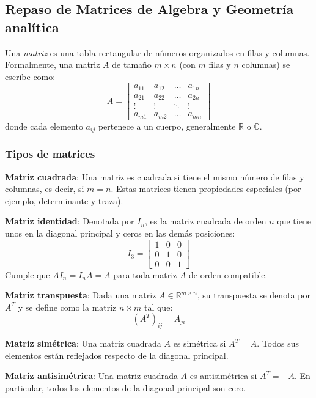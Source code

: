 \subsection{Repaso de Matrices de Algebra y Geometría analítica}
\label{sec:repaso_matrices}

Una \textit{matriz} es una tabla rectangular de números organizados en filas y columnas. Formalmente, una matriz \(A\) de tamaño \(m \times n\) (con \(m\) filas y \(n\) columnas) se escribe como:
\[
A = \begin{bmatrix}
a_{11} & a_{12} & \dots & a_{1n} \\
a_{21} & a_{22} & \dots & a_{2n} \\
\vdots & \vdots & \ddots & \vdots \\
a_{m1} & a_{m2} & \dots & a_{mn}
\end{bmatrix}
\]
donde cada elemento \(a_{ij}\) pertenece a un cuerpo, generalmente \(\mathbb{R}\) o \(\mathbb{C}\).

\subsubsection{Tipos de matrices}

\textbf{Matriz cuadrada}: Una matriz es cuadrada si tiene el mismo número de filas y columnas, es decir, si \(m = n\). Estas matrices tienen propiedades especiales (por ejemplo, determinante y traza).

\textbf{Matriz identidad}: Denotada por \(I_n\), es la matriz cuadrada de orden \(n\) que tiene unos en la diagonal principal y ceros en las demás posiciones:
\[
I_3 = \begin{bmatrix}
1 & 0 & 0 \\
0 & 1 & 0 \\
0 & 0 & 1
\end{bmatrix}
\]
Cumple que \(AI_n = I_nA = A\) para toda matriz \(A\) de orden compatible.

\textbf{Matriz transpuesta}: Dada una matriz \(A \in \mathbb{R}^{m \times n}\), su transpuesta se denota por \(A^T\) y se define como la matriz \(n \times m\) tal que:
\[
(A^T)_{ij} = A_{ji}
\]

\textbf{Matriz simétrica}: Una matriz cuadrada \(A\) es simétrica si \(A^T = A\). Todos sus elementos están reflejados respecto de la diagonal principal.

\textbf{Matriz antisimétrica}: Una matriz cuadrada \(A\) es antisimétrica si \(A^T = -A\). En particular, todos los elementos de la diagonal principal son cero.

